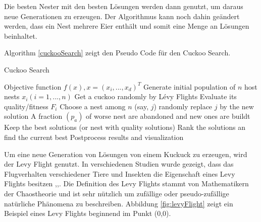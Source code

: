 \documentclass[conference]{IEEEtran}
\begin{document}
      Die besten Nester mit den besten Lösungen werden dann genutzt, um daraus neue Generationen zu erzeugen. 
      Der Algorithmus kann noch dahin geändert werden, dass ein Nest mehrere Eier enthält und somit eine Menge an Lösungen beinhaltet.

      {Algorithm \ref{cuckooSearch}} zeigt den Pseudo Code für den Cuckoo Search. 

      \begin{algorithm}
      \caption{Cuckoo Search}\label{cuckooSearch}
        \begin{algorithmic}[1]
        \State Objective function $f(x), x = (x_{i}, ...,x_{d})^T$
        \State Generate initial population of $n$ host nests $x_{i} (i =1,...,n)$
          \State Get a cuckoo randomly by Lévy Flights
          \State Evaluate its quality/fitness $F_{i}$
          \State Choose a nest among $n$ (say, $j$) randomly
            \State replace $j$ by the new solution
          \EndIf
          \State A fraction $(p_{a})$ of worse nest are abandoned 
          \State and new ones are buildt 
          \State Keep the best solutions (or nest with quality solutions)
          \State Rank the solutions an find the current best
        \EndWhile
        \State Postprocess results and visualization
        \end{algorithmic}
      \end{algorithm}

      Um eine neue Generation von Lösungen von einem Kuckuck zu erzeugen, wird der Levy Flight genutzt. 
      In verschiedenen Studien wurde gezeigt, dass das Flugverhalten verschiedener Tiere und Insekten die 
      Eigenschaft eines Levy Flights besitzen \cite{b4},\cite{b5},\cite{b6}. Die Definition des Levy Flights 
      stammt von Mathematikern der Chaostheorie und ist sehr nützlich um zufällige oder pseudo-zufällige natürliche 
      Phänomena zu beschreiben. Abbildung \ref{fig:levyFlight} zeigt ein Beispiel eines Levy Flights beginnend im Punkt (0,0).
\end{document}
